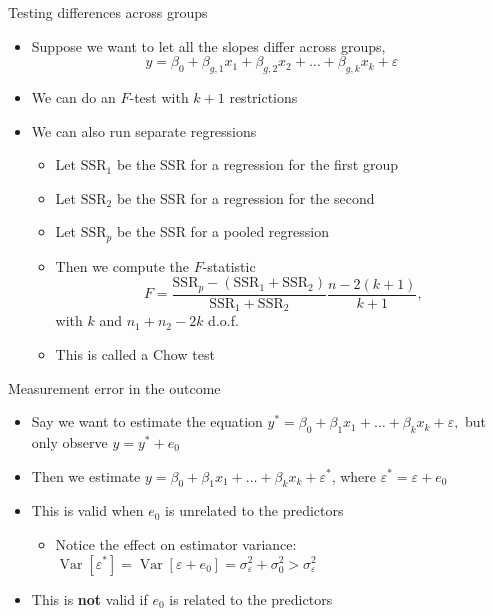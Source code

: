 \documentclass[
  ignorenonframetext,
]{beamer}
\providecommand{\tightlist}{%
  \setlength{\itemsep}{0pt}\setlength{\parskip}{0pt}}
\newcommand{\setsep}{\setlength{\itemsep}{3pt}}
\newcommand{\setskip}{\setlength{\parskip}{3pt}}
\renewcommand{\tightlist}{\setsep\setskip}
\begin{document}
\begin{frame}{Testing differences across groups}
\protect\hypertarget{testing-differences-across-groups}{}
\pause

\begin{itemize}[<+->]
\tightlist
\item
  Suppose we want to let all the slopes differ across groups,
  \[ y = \beta_0 + \beta_{g,1} x_1 + \beta_{g, 2} x_2 + \dots + \beta_{g, k} x_k + \varepsilon \]
\item
  We can do an \(F\)-test with \(k + 1\) restrictions
\item
  We can also run separate regressions

  \begin{itemize}[<+->]
  \tightlist
  \item
    Let \(\text{SSR}_1\) be the SSR for a regression for the first group
  \item
    Let \(\text{SSR}_2\) be the SSR for a regression for the second
  \item
    Let \(\text{SSR}_p\) be the SSR for a pooled regression
  \item
    Then we compute the \(F\)-statistic \[ F = \frac{\text{SSR}_p - (\text{SSR}_1 + \text{SSR}_2)}{\text{SSR}_1 + \text{SSR}_2} \frac{n - 2(k+1)}{k + 1}, \] with \(k\) and \(n_1 + n_2 - 2k\) d.o.f.
  \item
    This is called a Chow test
  \end{itemize}
\end{itemize}
\end{frame}

\begin{frame}{Measurement error in the outcome}
\protect\hypertarget{measurement-error-in-the-outcome}{}
\pause

\begin{itemize}[<+->]
\tightlist
\item
  Say we want to estimate the equation \(y^\ast = \beta_0 + \beta_1 x_1 + \dots + \beta_k x_k + \varepsilon,\) but only observe \(y = y^\ast + e_0\)
\item
  Then we estimate \(y = \beta_0 + \beta_1 x_1 + \dots + \beta_k x_k + \varepsilon^\ast\), where \(\varepsilon^\ast = \varepsilon + e_0\)
\item
  This is valid when \(e_0\) is unrelated to the predictors

  \begin{itemize}[<+->]
  \tightlist
  \item
    Notice the effect on estimator variance: \(\ensuremath{\mathop{\mathrm{Var}}\left[\varepsilon^\ast\right]} = \ensuremath{\mathop{\mathrm{Var}}\left[\varepsilon + e_0\right]} = \sigma_\varepsilon^2 + \sigma_0^2 > \sigma_\varepsilon^2\)
  \end{itemize}
\item
  This is \textbf{not} valid if \(e_0\) is related to the predictors
\end{itemize}
\end{frame}
\end{document}
